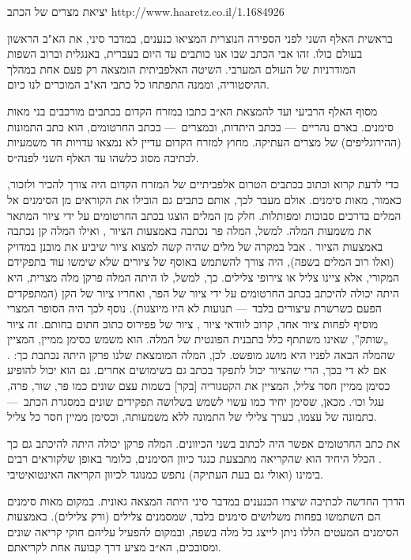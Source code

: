 יציאת מצרים של הכתב 
http://www.haaretz.co.il/1.1684926

בראשית האלף השני לפני הספירה הנוצרית המציאו כנענים, במדבר סיני, את הא"ב הראשון בעולם כולו. זהו אבי הכתב שבו אנו כותבים עד היום בעברית, באנגלית וברוב השפות המודרניות של העולם המערבי. השיטה האלפביתית הומצאה רק פעם אחת במהלך ההיסטוריה, וממנה התפתחו כל כתבי הא"ב המוכרים לנו כיום. 

מסוף האלף הרביעי ועד להמצאת הא״ב כתבו במזרח הקדום בכתבים מורכבים בני מאות סימנים. בארם נהריים~— בכתב היתדות, ובמצרים~— בכתב החרטומים, הוא כתב התמונות (ההירוגליפים) של מצרים העתיקה. מחוץ למזרח הקדום עדיין לא נמצאו עדויות חד משמעיות לכתיבה מסוג כלשהו עד האלף השני לפנה״ס.



כדי לדעת קרוא וכתוב בכתבים הטרום אלפביתיים של המזרח הקדום היה צורך להכיר ולזכור, כאמור, מאות סימנים. אולם מעבר לכך, אותם כתבים גם הובילו את הקוראים מן הסימנים אל המלים בדרכים סבוכות ומפותלות. חלק מן המלים הוצגו בכתב החרטומים על ידי ציור המתאר את משמעות המלה. למשל, המלה פר נכתבה באמצעות הציור , ואילו המלה קן נכתבה באמצעות הציור . אבל במקרה של מלים שהיה קשה למצוא ציור שיביע את מובנן במדויק (ואלו רוב המלים בשפה), היה צורך להשתמש באוסף של ציורים שלא שימשו עוד בתפקידם המקורי, אלא ציינו צליל או צירופי צלילים. כך, למשל, לו היתה המלה פרקן מלה מצרית, היא היתה יכולה להיכתב בכתב החרטומים על ידי ציור של הפר, ואחריו ציור של הקן (המתפקדים הפעם כשרשרת עיצורים בלבד~— תנועות לא היו מיוצגות). נוסף לכך היה הסופר המצרי מוסיף לפחות ציור אחד, קרוב לוודאי ציור , ציור של פפירוס כתוב חתום בחותם. זה ציור „שותק”, שאינו משתתף כלל בתבנית הפונטית של המלה. הוא משמש כסימן ממיין, המציין שהמלה הבאה לפניו היא מושג מופשט. לכן, המלה המומצאת שלנו פרקן היתה נכתבת כך:
.
אם לא די בכך, הרי שהציור יכול לתפקד בכתב גם בשימושים אחרים. גם הוא יכול להופיע כסימן ממיין חסר צליל, המציין את הקטגוריה [בקר] בשמות עצם שונים כמו פר, שור, פרה, עגל וכו׳. מכאן, שסימן יחיד כמו עשוי לשמש בשלושה תפקידים שונים במסגרת הכתב~— כתמונה של עצמו, כערך צלילי של התמונה ללא משמעותה, וכסימן ממיין חסר כל צליל.

את כתב החרטומים אפשר היה לכתוב בשני הכיוונים. המלה פרקן יכולה היתה להיכתב גם כך . הכלל היחיד הוא שהקריאה מתבצעת כנגד כיוון הסימנים, כלומר באופן שלקוראים רבים בימינו (ואולי גם בעת העתיקה) נתפש כמנוגד לכיוון הקריאה האינטואיטיבי.

הדרך החדשה לכתיבה שיצרו הכנענים במדבר סיני היתה המצאה גאונית. במקום מאות סימנים הם השתמשו בפחות משלושים סימנים בלבד, שמסמנים צלילים (ורק צלילים). באמצעות הסימנים המעטים הללו ניתן לייצג כל מלה בשפה, ובמקום להפעיל עליהם חוקי קריאה שונים ומסובכים, הא״ב מציע דרך קבועה אחת לקריאתם.

